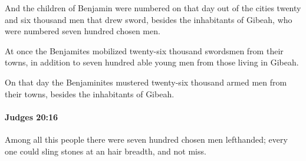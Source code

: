 			\begin{versebox}
					\item[BHS] 
					\item[ASV] And the children of Benjamin were numbered on that day out of the cities twenty and six thousand men that drew sword, besides the inhabitants of Gibeah, who were numbered seven hundred chosen men.
					\item[NIV] At once the Benjamites mobilized twenty-six thousand swordsmen from their towns, in addition to seven hundred able young men from those living in Gibeah.
					\item[NRSV] On that day the Benjaminites mustered twenty-six thousand armed men from their towns, besides the inhabitants of Gibeah.
			\end{versebox}

		\paragraph{Judges 20:16} %
			\label{JUDGES-20-16}

			Among all this people there were seven hundred chosen men lefthanded; every one could sling stones at an hair breadth, and not miss.

